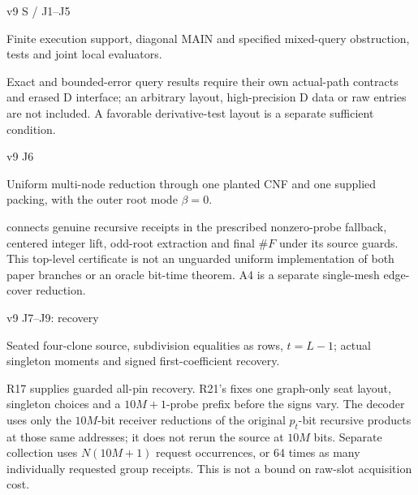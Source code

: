 \documentclass[11pt,a4paper]{article}
\newlength{\OfflineResearchTableWidth}
\newcommand{\OfflineResearchRow}{\par}
\newenvironment{OfflineResearchTable}{%
  \par\medskip\begingroup\small\setlength{\parindent}{0pt}%
  \setlength{\parskip}{3pt plus 1pt minus .5pt}%
  \setlength{\OfflineResearchTableWidth}{\linewidth}%
}{%
  \par\endgroup\medskip%
}
\begin{document}
\begin{OfflineResearchTable}
\OfflineResearchRow
\noindent%
\begin{minipage}[t]{0.14074\OfflineResearchTableWidth}\raggedright
v9 S / J1--J5
\end{minipage}\hfill%
\begin{minipage}[t]{0.31165\OfflineResearchTableWidth}\raggedright
Finite execution support, diagonal MAIN and specified mixed-query obstruction, tests and joint local evaluators.
\end{minipage}\hfill%
\begin{minipage}[t]{0.49261\OfflineResearchTableWidth}\raggedright
Exact and bounded-error query results require their own actual-path contracts and erased D interface; an arbitrary layout, high-precision D data or raw entries are not included. A favorable derivative-test layout is a separate sufficient condition.
\end{minipage}%
\OfflineResearchRow
\noindent%
\begin{minipage}[t]{0.14074\OfflineResearchTableWidth}\raggedright
v9 J6
\end{minipage}\hfill%
\begin{minipage}[t]{0.31165\OfflineResearchTableWidth}\raggedright
Uniform multi-node reduction through one planted CNF and one supplied packing, with the outer root mode \(\beta=0\).
\end{minipage}\hfill%
\begin{minipage}[t]{0.49261\OfflineResearchTableWidth}\raggedright
{} connects genuine recursive receipts in the prescribed nonzero-probe fallback, centered integer lift, odd-root extraction and final \(\#F\) under its source guards. This top-level certificate is not an unguarded uniform implementation of both paper branches or an oracle bit-time theorem. A4 is a separate single-mesh edge-cover reduction.
\end{minipage}%
\OfflineResearchRow
\noindent%
\begin{minipage}[t]{0.14074\OfflineResearchTableWidth}\raggedright
v9 J7--J9: recovery
\end{minipage}\hfill%
\begin{minipage}[t]{0.31165\OfflineResearchTableWidth}\raggedright
Seated four-clone source, subdivision equalities as rows, \(t=L-1\); actual singleton moments and signed first-coefficient recovery.
\end{minipage}\hfill%
\begin{minipage}[t]{0.49261\OfflineResearchTableWidth}\raggedright
R17 supplies guarded all-pin recovery. R21's  fixes one graph-only seat layout, singleton choices and a \(10M+1\)-probe prefix before the signs vary. The decoder uses only the \(10M\)-bit receiver reductions of the original \(p_t\)-bit recursive products at those same addresses; it does not rerun the source at \(10M\) bits. Separate collection uses \(N(10M+1)\) request occurrences, or 64 times as many individually requested group receipts. This is not a bound on raw-slot acquisition cost.

\end{minipage}
\end{OfflineResearchTable}
\end{document}
